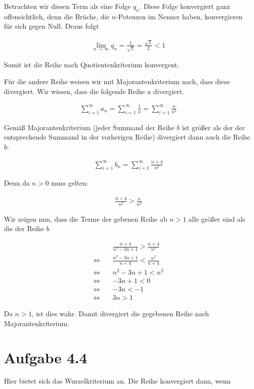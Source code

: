 \documentclass[a4paper,german,12pt,smallheadings]{scrartcl}
\begin{document}
Betrachten wir diesen Term als eine Folge $q_n$. Diese Folge konvergiert ganz
offensichtlich, denn die Brüche, die $n$-Potenzen im Nenner haben, konvergieren
für sich gegen Null. Draus folgt

\begin{align*}
  \lim_{n \to \infty} q_n = \frac{1}{\sqrt{2}} = \frac{\sqrt{2}}{2} < 1
\end{align*}

Somit ist die Reihe nach Quotientenkriterium konvergent.

Für die andere Reihe weisen wir mit Majorantenkriterium nach, dass diese divergiert. Wir wissen, dass die folgende Reihe $a$ divergiert.

\begin{align*}
  \sum_{i=1}^\infty a_n = \sum_{i=1}^\infty  \frac{1}{n} = \sum_{i=1}^\infty \frac{n}{n^2}
\end{align*}

Gemäß Majorantenkriterium (jeder Summand der Reihe $b$ ist größer als der der
entsprechende Summand in der vorherigen Reihe) divergiert dann auch die Reihe $b$:

\begin{align*}
  \sum_{i=1}^\infty b_n = \sum_{i=1}^\infty  \frac{n+4}{n^2}
\end{align*}

Denn da $n>0$ muss gelten:

\begin{align*}
  \frac{n+4}{n^2} > \frac{n}{n^2}
\end{align*}

Wir zeigen nun, dass die Terme der gebenen Reihe ab $n > 1$ alle größer sind
als die der Reihe $b$

\begin{align*}
 &\frac{n+4}{n^2-3n+1} > \frac{n+4}{n^2} \\
 \Leftrightarrow\quad& \frac{n^2-3n+1}{n+4} < \frac{n^2}{n+4} \\
 \Leftrightarrow\quad& n^2-3n+1 < n^2 \\
 \Leftrightarrow\quad& -3n+1 < 0 \\
 \Leftrightarrow\quad& -3n < -1 \\
 \Leftrightarrow\quad& 3n > 1
\end{align*}

Da $n > 1$, ist dies wahr. Damit divergiert die gegebenen Reihe nach Majorantenkriterium.

\section*{Aufgabe 4.4}
Hier bietet sich das Wurzelkriterium an. Die Reihe konvergiert dann, wenn
\end{document}
